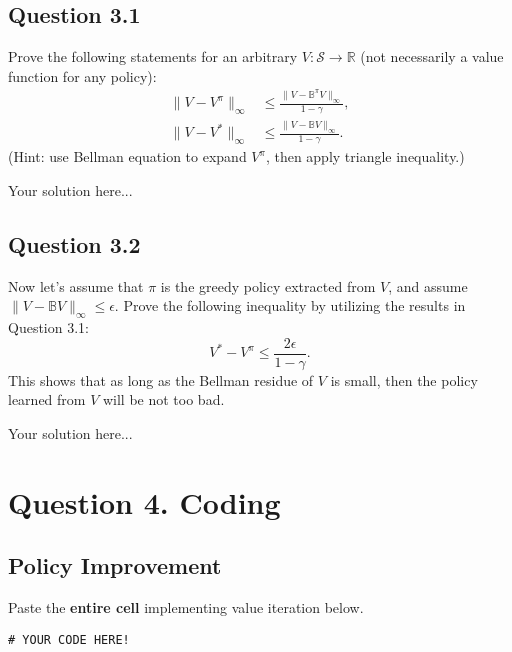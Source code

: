 \documentclass[12pt]{article}
\newcommand*{\bo}{\mathbb{B}}
\begin{document}
\subsection*{Question 3.1}Prove the following statements for an arbitrary $V: \mathcal{S} \rightarrow \mathbb{R}$ (not necessarily a value function for any policy):
\begin{align*}
    \|V - V^\pi \|_\infty &\leq \frac{\|V - \bo^\pi V\|_\infty}{1-\gamma},\\
    \|V - V^* \|_\infty &\leq \frac{\|V - \bo V\|_\infty}{1-\gamma}.
\end{align*}
(Hint: use Bellman equation to expand $V^\pi$, then apply triangle inequality.)
\begin{solution}
    Your solution here...
\end{solution}
\subsection*{Question 3.2} Now let's assume that $\pi$ is the greedy policy extracted from $V$, and assume $\|V - \bo V\|_\infty \leq \epsilon$. Prove the following inequality by utilizing the results in Question 3.1: 
$$V^* - V^{\pi} \leq  \frac{2\epsilon}{1-\gamma}.$$
This shows that as long as the Bellman residue of $V$ is small, then the policy learned from $V$ will be not too bad. 
\begin{solution}
    Your solution here...
\end{solution}
\section*{Question 4. Coding}
\subsection*{Policy Improvement}
Paste the \textbf{entire cell}  implementing value iteration below.
\begin{solution}
    \begin{verbatim}
# YOUR CODE HERE!
    \end{verbatim}
\end{solution}
\end{document}
